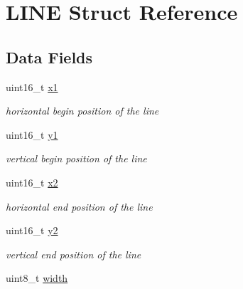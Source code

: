 \hypertarget{struct_l_i_n_e}{}\section{L\+I\+NE Struct Reference}
\label{struct_l_i_n_e}
\subsection*{Data Fields}
\begin{DoxyCompactItemize}
\item 
\mbox{\label{struct_l_i_n_e_aedb5fdfe3c1d1a915b668ba7f3950753}} 
uint16\+\_\+t \hyperlink{struct_l_i_n_e_aedb5fdfe3c1d1a915b668ba7f3950753}{x1}
\begin{DoxyCompactList}\small\item\em horizontal begin position of the line \end{DoxyCompactList}\item 
\mbox{\label{struct_l_i_n_e_a47ada631c22a9d40348069145654f255}} 
uint16\+\_\+t \hyperlink{struct_l_i_n_e_a47ada631c22a9d40348069145654f255}{y1}
\begin{DoxyCompactList}\small\item\em vertical begin position of the line \end{DoxyCompactList}\item 
\mbox{\label{struct_l_i_n_e_ac5bc000f8954f38b7a641a485a26bae7}} 
uint16\+\_\+t \hyperlink{struct_l_i_n_e_ac5bc000f8954f38b7a641a485a26bae7}{x2}
\begin{DoxyCompactList}\small\item\em horizontal end position of the line \end{DoxyCompactList}\item 
\mbox{\label{struct_l_i_n_e_aa377184ba406b3f0c4ac18c935378204}} 
uint16\+\_\+t \hyperlink{struct_l_i_n_e_aa377184ba406b3f0c4ac18c935378204}{y2}
\begin{DoxyCompactList}\small\item\em vertical end position of the line \end{DoxyCompactList}\item 
\mbox{\label{struct_l_i_n_e_a09a2a45f731b02946ff6d3cd15c1a476}} 
uint8\+\_\+t \hyperlink{struct_l_i_n_e_a09a2a45f731b02946ff6d3cd15c1a476}{width}

\end{DoxyCompactItemize}
